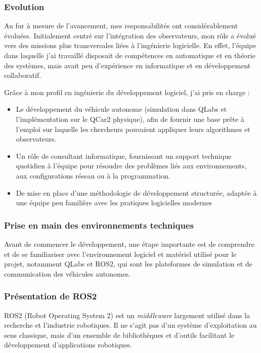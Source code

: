 \documentclass{name}
\begin{document}
\newpage

\subsubsection*{Evolution}

Au fur à mesure de l'avancement, mes responsabilités ont considérablement évoluées. Initialement centré sur l'intégration des observateurs, mon rôle a évolué vers des missions plus transversales liées à l'ingénierie logicielle. En effet, l'équipe dans laquelle j'ai travaillé disposait de compétences en automatique et en théorie des systèmes, mais avait peu d'expérience en informatique et en développement collaboratif.

Grâce à mon profil en ingénierie du développement logiciel, j'ai pris en charge :

\begin{itemize}
  \item Le développement du véhicule autonome (simulation dans QLabs et l'implémentation sur le QCar2 physique), afin de fournir une base prête à l'emploi sur laquelle les chercheurs pouvaient appliquer leurs algorithmes et observateurs.
  \item Un rôle de consultant informatique, fournissant un support technique quotidien à l'équipe pour résoudre des problèmes liés aux environnements, aux configurations réseau ou à la programmation.
  \item De mise en place d'une méthodologie de développement structurée, adaptée à une équipe peu familière avec les pratiques logicielles modernes
\end{itemize}

\subsubsection{Prise en main des environnements techniques}

Avant de commencer le développement, une étape importante est de comprendre et de se familiariser avec l'environnement logiciel et matériel utilisé pour le projet, notamment QLabs et ROS2, qui sont les plateformes de simulation et de communication des véhicules autonomes.

\subsubsection*{Présentation de ROS2}

ROS2 (Robot Operating System 2) est un \textit{middleware} largement utilisé dans la recherche et l'industrie robotiques. Il ne s'agit pas d'un système d'exploitation au sens classique, mais d'un ensemble de bibliothèques et d'outils facilitant le développement d'applications robotiques.
\end{document}
